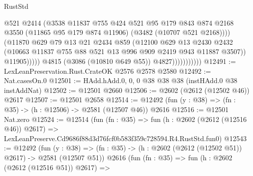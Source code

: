 \begin{lexlean}{RustStd}
\begin{coremodule}
                                    @521
                                    @2414
                                    (@3538
                                      @11837
                                      @755
                                      @424
                                      @521
                                      @95
                                      @179
                                      @843
                                      @874
                                      @2168
                                      @3550
                                      (@11865 @95 @179 @874 @11906)
                                      (@3482 (@10707 @521 @2168))))
                                  (@11870
                                    @629
                                    @79
                                    @13
                                    @21
                                    @2434
                                    @859
                                    (@12100
                                      @629
                                      @13
                                      @2430
                                      @2432
                                      (@10663
                                        @11837
                                        @755
                                        @88
                                        @521
                                        @13
                                        @996
                                        @909
                                        @2419
                                        @943
                                        @11887
                                        @3507))
                                    @11905)))))
                          @4815
                          (@3086 (@10810 @649 @55))
                          @4827)))))))))))
@12491 := LexLeanPreservation.Rust.CrateOK @2576 @2578 @2580
@12492 := Nat.casesOn.{0}
@12501 := HAdd.hAdd.{0, 0, 0} @38 @38 @38 (instHAdd.{0} @38 instAddNat)
@12502 := @12501 @2660
@12506 := @2602 (@2612 (@12502 @46)) @2617
@12507 := @12501 @2658
@12514 := @12492 (fun (y : @38) => (fn : @35) -> (h : @12506) -> @2581 (@12507 @46)) @2616
@12516 := @12501 Nat.zero
@12524 := @12514
    (fun (fn : @35) =>
    fun (h : @2602 (@2612 (@12516 @46)) @2617) =>
    LexLeanPreserve.Cd9686f88d3d76fcf0b583f359c728594.R4.RustStd.fun0)
@12543 := @12492
    (fun (y : @38) => (fn : @35) -> (h : @2602 (@2612 (@12502 @51)) @2617) -> @2581 (@12507 @51))
    @2616
    (fun (fn : @35) =>
    fun (h : @2602 (@2612 (@12516 @51)) @2617) =>

\end{coremodule}
\end{lexlean}
